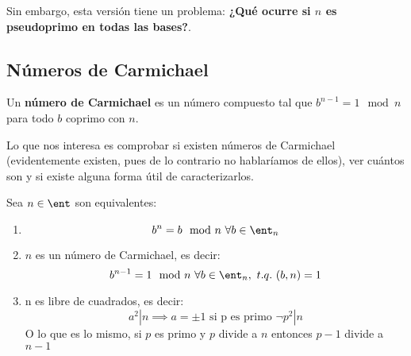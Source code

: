 Sin embargo, esta versión tiene un problema: \textbf{¿Qué ocurre si $n$ es pseudoprimo en todas las bases?}.

\subsection{Números de Carmichael}

\begin{defn}
Un \textbf{número de Carmichael} es un número compuesto tal que $b^{n-1}=1 \mod n$ para todo $b$ coprimo con $n$.
\end{defn}

Lo que nos interesa es comprobar si existen números de Carmichael (evidentemente existen, pues de lo contrario no hablaríamos de ellos), ver cuántos son y si existe alguna forma útil de caracterizarlos.

\begin{theorem}\label{theorem:Korset}
Sea $n \in \ent$ son equivalentes:
\begin{enumerate}
\item \[b^n=b \mod n \ \forall b \in \ent_n\]
\item $n$ es un número de Carmichael, es decir:
\[b^{n-1} = 1 \mod n \ \forall b \in \ent_n, \ t.q. \ (b,n)=1 \]
\item n es libre de cuadrados, es decir:
\[a^2|n \implies a = \pm 1 \text{ si p es primo } \neg p^2 | n\]
O lo que es lo mismo, si $p$ es primo y $p$ divide a $n$ entonces $p-1$ divide a $n-1$
\end{enumerate}
\end{theorem}

